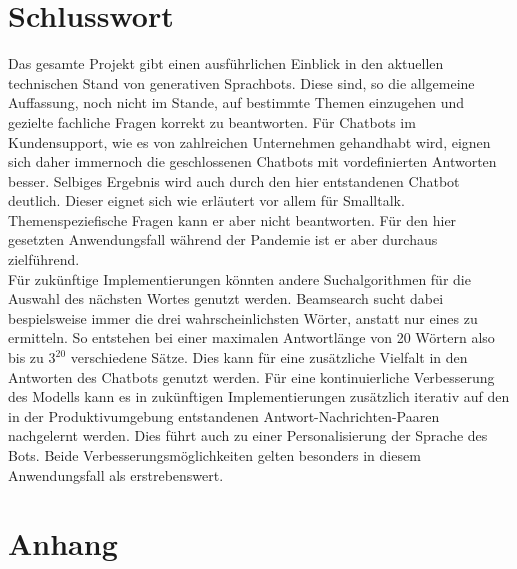 \documentclass{aa}
\begin{document}
    \section{Schlusswort}
    Das gesamte Projekt gibt einen ausführlichen Einblick in den aktuellen technischen Stand von generativen Sprachbots. Diese sind, so die allgemeine Auffassung, noch nicht im Stande, auf bestimmte Themen einzugehen und gezielte fachliche Fragen korrekt zu beantworten. Für Chatbots im Kundensupport, wie es von zahlreichen Unternehmen gehandhabt wird, eignen sich daher immernoch die geschlossenen Chatbots mit vordefinierten Antworten besser. Selbiges Ergebnis wird auch durch den hier entstandenen Chatbot deutlich. Dieser eignet sich wie erläutert vor allem für Smalltalk. Themenspeziefische Fragen kann er aber nicht beantworten. Für den hier gesetzten Anwendungsfall während der Pandemie ist er aber durchaus zielführend.\\
    Für zukünftige Implementierungen könnten andere Suchalgorithmen für die Auswahl des nächsten Wortes genutzt werden. Beamsearch sucht dabei bespielsweise immer die drei wahrscheinlichsten Wörter, anstatt nur eines zu ermitteln. So entstehen bei einer maximalen Antwortlänge von 20 Wörtern also bis zu $3^{20}$ verschiedene Sätze. Dies kann für eine zusätzliche Vielfalt in den Antworten des Chatbots genutzt werden. Für eine kontinuierliche Verbesserung des Modells kann es in zukünftigen Implementierungen zusätzlich iterativ auf den in der Produktivumgebung entstandenen Antwort-Nachrichten-Paaren nachgelernt werden. Dies führt auch zu einer Personalisierung der Sprache des Bots. Beide Verbesserungsmöglichkeiten gelten besonders in diesem Anwendungsfall als erstrebenswert.

\section{Anhang}
\end{document}
